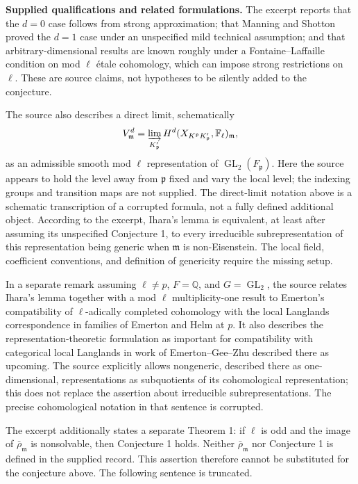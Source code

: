 \documentclass[11pt]{article}
\newcommand{\Q}{\mathbb{Q}}
\newcommand{\F}{\mathbb{F}}
\begin{document}
\textbf{Supplied qualifications and related formulations.} The excerpt reports that the \(d=0\) case follows from strong approximation; that Manning and Shotton proved the \(d=1\) case under an unspecified mild technical assumption; and that arbitrary-dimensional results are known roughly under a Fontaine--Laffaille condition on mod \(\ell\) \'etale cohomology, which can impose strong restrictions on \(\ell\). These are source claims, not hypotheses to be silently added to the conjecture.

The source also describes a direct limit, schematically
\[
V^d_{\mathfrak m}
=\varinjlim_{K'_{\mathfrak p}}
H^d(X_{K^{\mathfrak p}K'_{\mathfrak p}},\F_\ell)_{\mathfrak m},
\]
as an admissible smooth mod \(\ell\) representation of \(\operatorname{GL}_2(F_{\mathfrak p})\). Here the source appears to hold the level away from \(\mathfrak p\) fixed and vary the local level; the indexing groups and transition maps are not supplied. The direct-limit notation above is a schematic transcription of a corrupted formula, not a fully defined additional object. According to the excerpt, Ihara's lemma is equivalent, at least after assuming its unspecified Conjecture 1, to every irreducible subrepresentation of this representation being generic when \(\mathfrak m\) is non-Eisenstein. The local field, coefficient conventions, and definition of genericity require the missing setup.

In a separate remark assuming \(\ell\ne p\), \(F=\Q\), and \(G=\operatorname{GL}_2\), the source relates Ihara's lemma together with a mod \(\ell\) multiplicity-one result to Emerton's compatibility of \(\ell\)-adically completed cohomology with the local Langlands correspondence in families of Emerton and Helm at \(p\). It also describes the representation-theoretic formulation as important for compatibility with categorical local Langlands in work of Emerton--Gee--Zhu described there as upcoming. The source explicitly allows nongeneric, described there as one-dimensional, representations as subquotients of its cohomological representation; this does not replace the assertion about irreducible subrepresentations. The precise cohomological notation in that sentence is corrupted.

The excerpt additionally states a separate Theorem 1: if \(\ell\) is odd and the image of \(\bar\rho_{\mathfrak m}\) is nonsolvable, then Conjecture 1 holds. Neither \(\bar\rho_{\mathfrak m}\) nor Conjecture 1 is defined in the supplied record. This assertion therefore cannot be substituted for the conjecture above. The following sentence is truncated.
\end{document}

